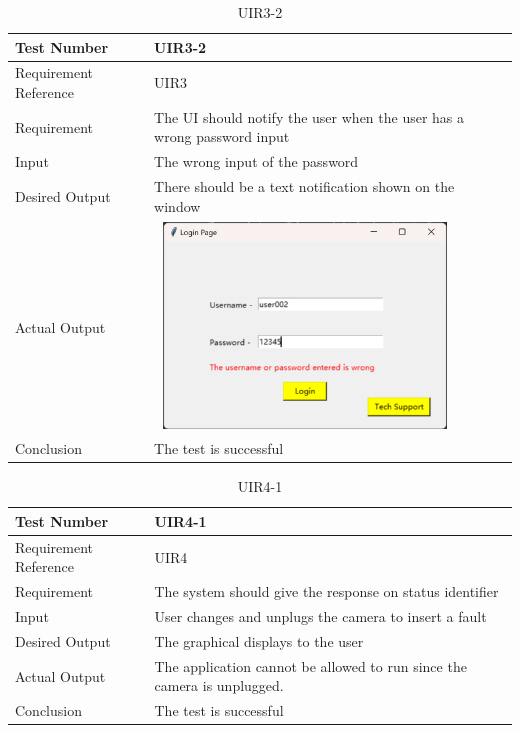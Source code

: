 \documentclass[12pt, titlepage]{article}
\begin{document}
\begin{table}[H]
\begin{center}
\begin{tabular}{|l | m{9cm}|}
\hline
  Test Number & UIR3-2\\
  \hline
  Requirement Reference & UIR3\\
  \hline
  Requirement & The UI should notify the user when the user has a wrong password input \\
  \hline
  Input & The wrong input of the password\\
  \hline
  Desired Output & There should be a text notification shown on the window\\
  \hline
  Actual Output & \includegraphics[width=80mm, height=55mm]{UIR11.png}\\
  \hline
  Conclusion & The test is successful\\
  \hline
\end{tabular}
\end{center}   
\caption{UIR3-2}
\end{table}



\begin{table}[H]
\begin{center}
\begin{tabular}{|l | m{9cm}|}
\hline
  Test Number & UIR4-1\\
  \hline
  Requirement Reference & UIR4\\
  \hline
  Requirement & The system should give the response on status identifier\\
  \hline
  Input & User changes and unplugs the camera to insert a fault\\
  \hline
  Desired Output & The graphical displays to the user\\
  \hline
  Actual Output & The application cannot be allowed to run since the camera is unplugged.\\
  \hline
  Conclusion & The test is successful\\
  \hline
\end{tabular}
\end{center}   
\caption{UIR4-1}
\end{table}
\end{document}
